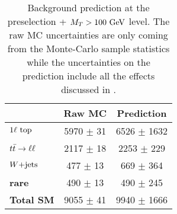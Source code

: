         \begin{table}[!ht]
            \begin{center}
                \begin{tabular}{|l|c|c|}
                    \hline
                                             &  \textbf{Raw MC}    & \textbf{Prediction}       \\
                    \hline
                    \textbf{$1\ell~\text{top}$} &  5970 $\pm$ 31      & 6526 $\pm$ 1632     \\
                    \textbf{$t\bar{t} \rightarrow \ell \ell$}  &  2117 $\pm$ 18      & 2253 $\pm$  229     \\
                    \textbf{$\text{$W$+jets}$}        &   477 $\pm$ 13      &  669 $\pm$  364     \\
                    \textbf{rare}            &   490 $\pm$ 13      &  490 $\pm$  245     \\
                    \hline
                    \textbf{Total SM}        &  9055 $\pm$ 41      & 9940 $\pm$ 1666     \\
                    \hline
                \end{tabular}
                \caption{Background prediction at the preselection + $M_T > 100~\text{GeV}$ level.
                The raw MC uncertainties are only coming from the Monte-Carlo sample statistics
                while the uncertainties on the prediction include all the effects discussed
                in .}
                \label{tab:predictionPreselection}
            \end{center}
        \end{table}

